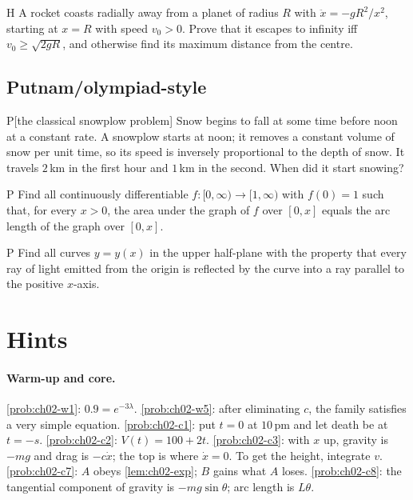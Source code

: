 \begin{problem}{H}\label{prob:ch02-h5}
A rocket coasts radially away from a planet of radius $R$ with
$\ddot{x} = -gR^2/x^2$, starting at $x = R$ with speed $v_0>0$. Prove that it
escapes to infinity iff $v_0\ge\sqrt{2gR}$, and otherwise find its maximum
distance from the centre.
\end{problem}

\subsection*{Putnam/olympiad-style}

\begin{problem}{P}[the classical snowplow problem]\label{prob:ch02-p1}
Snow begins to fall at some time before noon at a constant rate. A snowplow
starts at noon; it removes a constant volume of snow per unit time, so its
speed is inversely proportional to the depth of snow. It travels $2$\,km in
the first hour and $1$\,km in the second. When did it start snowing?
\end{problem}

\begin{problem}{P}\label{prob:ch02-p2}
Find all continuously differentiable $f:[0,\infty)\to[1,\infty)$ with $f(0) = 1$
such that, for every $x>0$, the area under the graph of $f$ over $[0,x]$
equals the arc length of the graph over $[0,x]$.
\end{problem}

\begin{problem}{P}\label{prob:ch02-p3}
Find all curves $y = y(x)$ in the upper half-plane with the property that every
ray of light emitted from the origin is reflected by the curve into a ray
parallel to the positive $x$-axis.
\end{problem}

\section{Hints}\label{sec:ch02-hints}

\paragraph{Warm-up and core.}
\cref{prob:ch02-w1}: $0.9 = e^{-3\lambda}$.
\cref{prob:ch02-w5}: after eliminating $c$, the family satisfies a very simple
equation.
\cref{prob:ch02-c1}: put $t = 0$ at $10$\,pm and let death be at $t = -s$.
\cref{prob:ch02-c2}: $V(t) = 100 + 2t$.
\cref{prob:ch02-c3}: with $x$ up, gravity is $-mg$ and drag is $-c\dot x$; the top
is where $\dot x = 0$. To get the height, integrate $v$.
\cref{prob:ch02-c7}: $A$ obeys \cref{lem:ch02-exp}; $B$ gains what $A$ loses.
\cref{prob:ch02-c8}: the tangential component of gravity is $-mg\sin\theta$;
arc length is $L\theta$.

